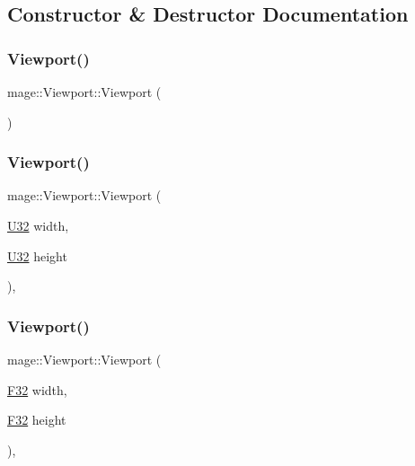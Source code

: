 \subsection{Constructor \& Destructor Documentation}
\hypertarget{classmage_1_1_viewport_a0bc300b1cb281972538509a0bb19378d}{}\label{classmage_1_1_viewport_a0bc300b1cb281972538509a0bb19378d} 
\subsubsection{\texorpdfstring{Viewport()}{Viewport()}\hspace{0.1cm}{\footnotesize\ttfamily [1/9]}}
{\footnotesize\ttfamily mage\+::\+Viewport\+::\+Viewport (\begin{DoxyParamCaption}{ }\end{DoxyParamCaption})\hspace{0.3cm}{\ttfamily [noexcept]}}

\hypertarget{classmage_1_1_viewport_ad0950f9c6b628170c6e2431cb0f05044}{}\label{classmage_1_1_viewport_ad0950f9c6b628170c6e2431cb0f05044} 
\subsubsection{\texorpdfstring{Viewport()}{Viewport()}\hspace{0.1cm}{\footnotesize\ttfamily [2/9]}}
{\footnotesize\ttfamily mage\+::\+Viewport\+::\+Viewport (\begin{DoxyParamCaption}\item[{\hyperlink{namespacemage_a41c104c036fba3756a74e19f793eeaa1}{U32}}]{width,  }\item[{\hyperlink{namespacemage_a41c104c036fba3756a74e19f793eeaa1}{U32}}]{height }\end{DoxyParamCaption})\hspace{0.3cm}{\ttfamily [explicit]}, {\ttfamily [noexcept]}}

\hypertarget{classmage_1_1_viewport_abd81e3af844e61ef53502142e1239191}{}\label{classmage_1_1_viewport_abd81e3af844e61ef53502142e1239191} 
\subsubsection{\texorpdfstring{Viewport()}{Viewport()}\hspace{0.1cm}{\footnotesize\ttfamily [3/9]}}
{\footnotesize\ttfamily mage\+::\+Viewport\+::\+Viewport (\begin{DoxyParamCaption}\item[{\hyperlink{namespacemage_aa97e833b45f06d60a0a9c4fc22ae02c0}{F32}}]{width,  }\item[{\hyperlink{namespacemage_aa97e833b45f06d60a0a9c4fc22ae02c0}{F32}}]{height }\end{DoxyParamCaption})\hspace{0.3cm}{\ttfamily [explicit]}, {\ttfamily [noexcept]}}

